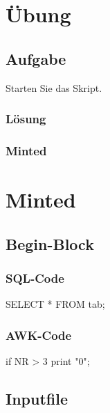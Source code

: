 \section{Übung}
\label{sec:uebung_01}

\subsection{Aufgabe}
\label{sec:uebung_01.aufgabe_01}
Starten Sie das Skript.

\subsubsection*{Lösung}
\label{sec:uebung_01.aufgabe_01.loesung}

\subsubsection*{Minted}


\section{Minted}

\subsection{Begin-Block}

\subsubsection{SQL-Code}
\begin{sqlcode}
  SELECT *
  FROM tab;
\end{sqlcode}

\subsubsection{AWK-Code}
\begin{awkcode}
  if NR > 3 {
    print "0";
  }
\end{awkcode}


\subsection{Inputfile}

